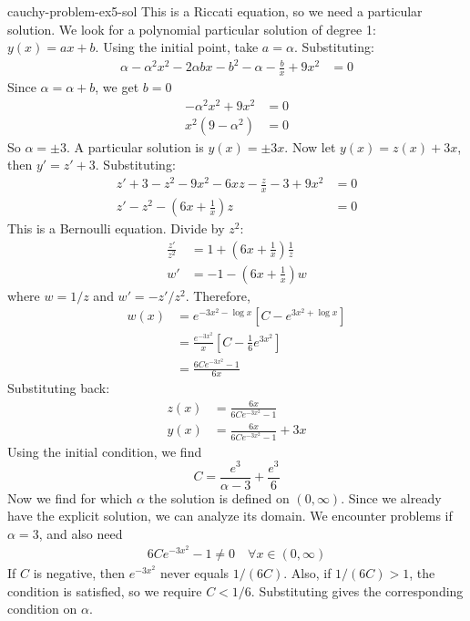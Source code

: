 \documentclass[preview]{standalone}
\begin{document}
\begin{snippetsolution}{cauchy-problem-ex5-sol}{}
    This is a Riccati equation, so we need a particular solution.
    We look for a polynomial particular solution of degree 1: \(y(x) = ax + b\).
    Using the initial point, take \(a = \alpha\).
    Substituting:
    \begin{align*}
        \alpha - \alpha^2x^2 - 2\alpha bx - b^2 - \alpha - \frac{b}{x} + 9x^2 &= 0
    \end{align*}
    Since \(\alpha = \alpha + b\), we get \(b = 0\)
    \begin{align*}
        -\alpha^2 x^2 + 9x^2 &= 0 \\
        x^2(9 - \alpha^2) &= 0
    \end{align*}
    So \(\alpha = \pm 3\).
    A particular solution is \(y(x) = \pm 3x\).
    Now let \(y(x) = z(x) + 3x\), then \(y' = z' + 3\).
    Substituting:
    \begin{align*}
        z' + 3 - z^2 - 9x^2 - 6xz - \frac{z}{x} - 3 + 9x^2 &= 0 \\
        z' - z^2 - \left(6x + \frac{1}{x}\right)z &= 0
    \end{align*}
    This is a Bernoulli equation. Divide by \(z^2\):
    \begin{align*}
        \frac{z'}{z^2} &= 1 + \left(6x + \frac{1}{x}\right) \frac{1}{z} \\
        w' &= -1 - \left(6x + \frac{1}{x}\right) w
    \end{align*}
    where \(w = 1/z\) and \(w' = -z'/z^2\).
    Therefore,
    \begin{align*}
        w(x) &= e^{-3x^2 - \log x} \left[
            C - e^{3x^2 + \log x}
        \right] \\
        &= \frac{e^{-3x^2}}{x}\left[
            C - \frac{1}{6}e^{3x^2}
        \right] \\
        &= \frac{6Ce^{-3x^2} - 1}{6x}
    \end{align*}
    Substituting back:
    \begin{align*}
        z(x) &= \frac{6x}{6Ce^{-3x^2} - 1} \\
        y(x) &= \frac{6x}{6Ce^{-3x^2}-1} + 3x
    \end{align*}
    Using the initial condition, we find
    \[
        C = \frac{e^3}{\alpha - 3} + \frac{e^3}{6}
    \]
    Now we find for which \(\alpha\) the solution is defined on \((0, \infty)\).
    Since we already have the explicit solution, we can analyze its domain.
    We encounter problems if \(\alpha = 3\), and also need
    \begin{align*}
        6Ce^{-3x^2} - 1 \neq 0 \quad \forall x \in (0, \infty)
    \end{align*}
    If \(C\) is negative, then \(e^{-3x^2}\) never equals \(1/(6C)\).
    Also, if \(1/(6C) > 1\), the condition is satisfied, so we require \(C < 1/6\).
    Substituting gives the corresponding condition on \(\alpha\).
\end{snippetsolution}
\end{document}
